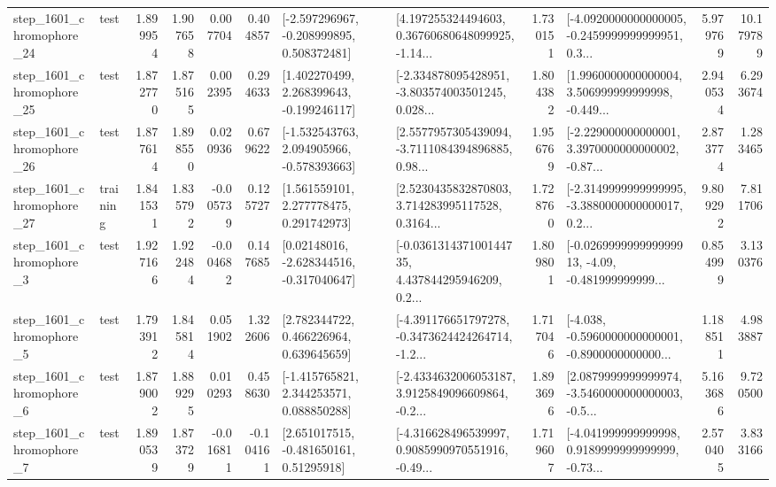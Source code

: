 \begin{tabular}{llrrrrllrlrr}
 step\_1601\_chromophore\_24 &      test &      1.899954 &    1.907658 &      0.007704 &  0.404857 &   [-2.597296967, -0.208999895, 0.508372481] &  [4.197255324494603, 0.36760680648099925, -1.14... &       1.730151 &  [-4.0920000000000005, -0.2459999999999951, 0.3... &            5.979769 &         10.179789 \\
 step\_1601\_chromophore\_25 &      test &      1.872770 &    1.875165 &      0.002395 &  0.294633 &    [1.402270499, 2.268399643, -0.199246117] &  [-2.334878095428951, -3.803574003501245, 0.028... &       1.804382 &  [1.9960000000000004, 3.506999999999998, -0.449... &            2.940534 &          6.293674 \\
 step\_1601\_chromophore\_26 &      test &      1.877614 &    1.898550 &      0.020936 &  0.679622 &   [-1.532543763, 2.094905966, -0.578393663] &  [2.5577957305439094, -3.7111084394896885, 0.98... &       1.956769 &  [-2.229000000000001, 3.3970000000000002, -0.87... &            2.873774 &          1.283465 \\
 step\_1601\_chromophore\_27 &  training &      1.841531 &    1.835792 &     -0.005739 &  0.125727 &     [1.561559101, 2.277778475, 0.291742973] &  [2.5230435832870803, 3.714283995117528, 0.3164... &       1.728760 &  [-2.3149999999999995, -3.3880000000000017, 0.2... &            9.809292 &          7.811706 \\
  step\_1601\_chromophore\_3 &      test &      1.927166 &    1.922484 &     -0.004682 &  0.147685 &    [0.02148016, -2.628344516, -0.317040647] &  [-0.036131437100144735, 4.437844295946209, 0.2... &       1.809801 &  [-0.026999999999999913, -4.09, -0.481999999999... &            0.854999 &          3.130376 \\
  step\_1601\_chromophore\_5 &      test &      1.793912 &    1.845814 &      0.051902 &  1.322606 &     [2.782344722, 0.466226964, 0.639645659] &  [-4.391176651797278, -0.3473624424264714, -1.2... &       1.717046 &  [-4.038, -0.5960000000000001, -0.8900000000000... &            1.188511 &          4.983887 \\
  step\_1601\_chromophore\_6 &      test &      1.879002 &    1.889295 &      0.010293 &  0.458630 &    [-1.415765821, 2.344253571, 0.088850288] &  [-2.4334632006053187, 3.9125849096609864, -0.2... &       1.893696 &  [2.0879999999999974, -3.5460000000000003, -0.5... &            5.163686 &          9.720500 \\
  step\_1601\_chromophore\_7 &      test &      1.890539 &    1.873729 &     -0.016811 & -0.104161 &     [2.651017515, -0.481650161, 0.51295918] &  [-4.316628496539997, 0.9085990970551916, -0.49... &       1.719607 &  [-4.041999999999998, 0.9189999999999999, -0.73... &            2.570405 &          3.833166 \\

\end{tabular}
